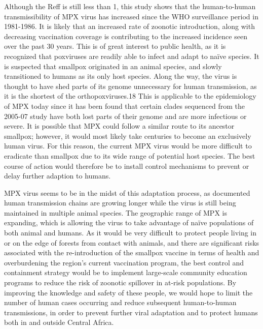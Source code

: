 Although the Reff is still less than 1, this study shows that the human-to-human transmissibility of MPX virus has increased since the WHO surveillance period in 1981-1986. It is likely that an increased rate of zoonotic introduction, along with decreasing vaccination coverage is contributing to the increased incidence seen over the past 30 years. This is of great interest to public health, as it is recognized that poxviruses are readily able to infect and adapt to naïve species. It is suspected that smallpox originated in an animal species, and slowly transitioned to humans as its only host species. Along the way, the virus is thought to have shed parts of its genome unnecessary for human transmission, as it is the shortest of the orthopoxviruses.18 This is applicable to the epidemiology of MPX today since it has been found that certain clades sequenced from the 2005-07 study have both lost parts of their genome and are more infectious or severe. It is possible that MPX could follow a similar route to its ancestor smallpox; however, it would most likely take centuries to become an exclusively human virus. For this reason, the current MPX virus would be more difficult to eradicate than smallpox due to its wide range of potential host species. The best course of action would therefore be to install control mechanisms to prevent or delay further adaption to humans.




MPX virus seems to be in the midst of this adaptation process, as documented human transmission chains are growing longer while the virus is still being maintained in multiple animal species. The geographic range of MPX is expanding, which is allowing the virus to take advantage of naïve populations of both animal and humans. As it would be very difficult to protect people living in or on the edge of forests from contact with animals, and there are significant risks associated with the re-introduction of the smallpox vaccine in terms of health and overburdening the region’s current vaccination program, the best control and containment strategy would be to implement large-scale community education programs to reduce the risk of zoonotic spillover in at-risk populations. By improving the knowledge and safety of these people, we would hope to limit the number of human cases occurring and reduce subsequent human-to-human transmissions, in order to prevent further viral adaptation and to protect humans both in 
and outside Central Africa. 


